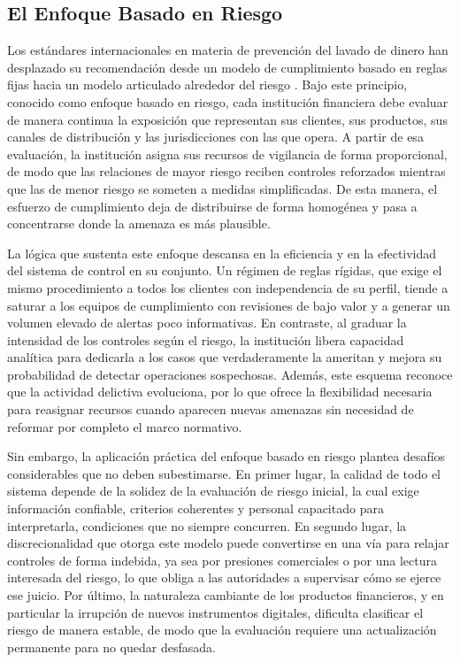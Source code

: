 \subsection{El Enfoque Basado en Riesgo}

Los estándares internacionales en materia de prevención del lavado de dinero han desplazado su recomendación desde un modelo de cumplimiento basado en reglas fijas hacia un modelo articulado alrededor del riesgo \cite{FATF2012InternationalRecommendations, BaselCommitteeonBankingSupervision2020SoundTerrorism}. Bajo este principio, conocido como enfoque basado en riesgo, cada institución financiera debe evaluar de manera continua la exposición que representan sus clientes, sus productos, sus canales de distribución y las jurisdicciones con las que opera. A partir de esa evaluación, la institución asigna sus recursos de vigilancia de forma proporcional, de modo que las relaciones de mayor riesgo reciben controles reforzados mientras que las de menor riesgo se someten a medidas simplificadas. De esta manera, el esfuerzo de cumplimiento deja de distribuirse de forma homogénea y pasa a concentrarse donde la amenaza es más plausible.

La lógica que sustenta este enfoque descansa en la eficiencia y en la efectividad del sistema de control en su conjunto. Un régimen de reglas rígidas, que exige el mismo procedimiento a todos los clientes con independencia de su perfil, tiende a saturar a los equipos de cumplimiento con revisiones de bajo valor y a generar un volumen elevado de alertas poco informativas. En contraste, al graduar la intensidad de los controles según el riesgo, la institución libera capacidad analítica para dedicarla a los casos que verdaderamente la ameritan y mejora su probabilidad de detectar operaciones sospechosas. Además, este esquema reconoce que la actividad delictiva evoluciona, por lo que ofrece la flexibilidad necesaria para reasignar recursos cuando aparecen nuevas amenazas sin necesidad de reformar por completo el marco normativo.

Sin embargo, la aplicación práctica del enfoque basado en riesgo plantea desafíos considerables que no deben subestimarse. En primer lugar, la calidad de todo el sistema depende de la solidez de la evaluación de riesgo inicial, la cual exige información confiable, criterios coherentes y personal capacitado para interpretarla, condiciones que no siempre concurren. En segundo lugar, la discrecionalidad que otorga este modelo puede convertirse en una vía para relajar controles de forma indebida, ya sea por presiones comerciales o por una lectura interesada del riesgo, lo que obliga a las autoridades a supervisar cómo se ejerce ese juicio. Por último, la naturaleza cambiante de los productos financieros, y en particular la irrupción de nuevos instrumentos digitales, dificulta clasificar el riesgo de manera estable, de modo que la evaluación requiere una actualización permanente para no quedar desfasada.

